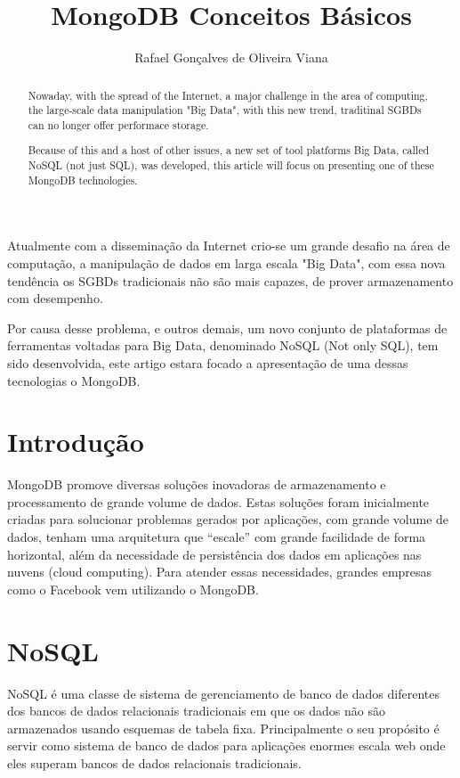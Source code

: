 \documentclass[12pt]{article}
\title{MongoDB Conceitos Básicos}
\author{Rafael Gonçalves de Oliveira Viana\inst{1} }
\begin{document}
 

\maketitle

\begin{abstract}
	Nowaday, with the spread of the Internet, a major challenge in the area of computing, the large-scale data manipulation "Big Data", with this new trend, traditinal SGBDs can no longer offer performace storage.
	
	Because of this and a host of other issues, a new set of tool platforms
	Big Data, called NoSQL (not just SQL), was developed, this article will focus on presenting one of these MongoDB technologies.
\end{abstract}
     
\begin{resumo} 
  Atualmente com a disseminação da Internet crio-se um grande desafio na área de computação, a manipulação de dados em larga escala "Big Data", com essa nova tendência os SGBDs tradicionais não são mais capazes, de prover armazenamento com desempenho.
  
  Por causa desse problema, e outros demais, um novo conjunto de plataformas de ferramentas voltadas para
  Big Data, denominado NoSQL (Not only SQL), tem sido desenvolvida, este artigo estara focado a apresentação de uma dessas tecnologias o MongoDB.
  
  
\end{resumo}


\section{Introdução}
MongoDB promove diversas soluções inovadoras de armazenamento e processamento de grande volume de dados. Estas soluções foram inicialmente criadas para solucionar problemas gerados por aplicações, com grande volume de dados, tenham uma arquitetura que “escale” com grande facilidade de forma horizontal, além da necessidade de persistência dos dados em aplicações nas nuvens (cloud computing). Para atender essas necessidades, grandes empresas como o Facebook vem utilizando o MongoDB.


\section{NoSQL}

NoSQL é uma classe de sistema de gerenciamento de banco de dados
diferentes dos bancos de dados relacionais tradicionais em que os dados não são
armazenados usando esquemas de tabela fixa. Principalmente o seu propósito é
servir como sistema de banco de dados para aplicações enormes escala web onde
eles superam bancos de dados relacionais tradicionais.
\end{document}
